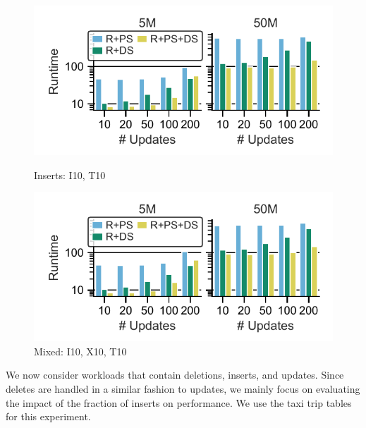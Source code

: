 \begin{figure}[t]
  \begin{minipage}[b]{0.47\linewidth}
    \centering
		\includegraphics[width=1.1\linewidth,trim=10 9 15 10, clip]{imgs/felix_inserts.pdf}
		\vspace{-6.5mm}
		\caption{Inserts: I10, T10}
		\label{fig:Inserts at I10}
	\end{minipage}
	\begin{minipage}[b]{0.52\linewidth}
      \centering
      \hspace{3mm}
      \includegraphics[width=0.9\linewidth,trim=30 9 15 10, clip]{imgs/felix_mixed.pdf}
		\vspace{-2.5mm}
		\caption{Mixed: I10, X10, T10}
		\label{fig:Mixed Updates at IX10}
	\end{minipage}
\end{figure}

We now consider workloads that contain deletions, inserts, and updates. Since deletes are handled in a similar fashion to updates, we mainly focus on evaluating the impact of the fraction of inserts on performance. We use the taxi trip tables for this experiment. %

